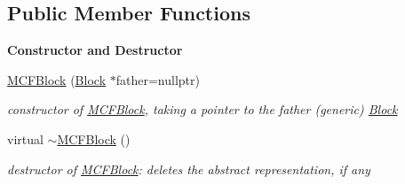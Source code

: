 \subsection*{Public Member Functions}
\begin{Indent}\textbf{ Constructor and Destructor}\par
\begin{DoxyCompactItemize}
\item 
\mbox{\hyperlink{class_s_m_spp__di__unipi__it_1_1_m_c_f_block_a50af38997f582a3ffe54ba6240e8e237}{M\+C\+F\+Block}} (\mbox{\hyperlink{class_s_m_spp__di__unipi__it_1_1_block}{Block}} $\ast$father=nullptr)
\begin{DoxyCompactList}\small\item\em constructor of \mbox{\hyperlink{class_s_m_spp__di__unipi__it_1_1_m_c_f_block}{M\+C\+F\+Block}}, taking a pointer to the father (generic) \mbox{\hyperlink{class_s_m_spp__di__unipi__it_1_1_block}{Block}} \end{DoxyCompactList}\item 
\mbox{\label{class_s_m_spp__di__unipi__it_1_1_m_c_f_block_a8ed64b294f81e72d5c3dd91aeddea735}} 
virtual \mbox{\hyperlink{class_s_m_spp__di__unipi__it_1_1_m_c_f_block_a8ed64b294f81e72d5c3dd91aeddea735}{$\sim$\+M\+C\+F\+Block}} ()
\begin{DoxyCompactList}\small\item\em destructor of \mbox{\hyperlink{class_s_m_spp__di__unipi__it_1_1_m_c_f_block}{M\+C\+F\+Block}}\+: deletes the abstract representation, if any \end{DoxyCompactList}\end{DoxyCompactItemize}
\end{Indent}

